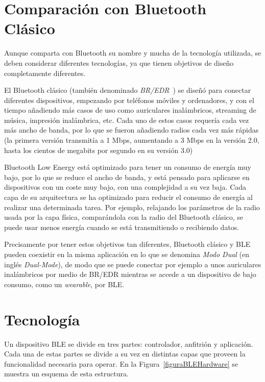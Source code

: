 \section{Comparación con Bluetooth Clásico}
\label{makereference2.1}

Aunque comparta con Bluetooth su nombre y mucha de la tecnología utilizada, se deben considerar diferentes tecnologías, ya que tienen objetivos de diseño completamente diferentes.

El Bluetooth clásico (también denominado \textit{BR/EDR}~\cite{bluetoothCS}) se diseñó para conectar diferentes dispositivos, empezando por teléfonos móviles y ordenadores, y con el tiempo añadiendo más casos de uso como auriculares inalámbricos, streaming de música, impresión inalámbrica, etc. Cada uno de estos casos requería cada vez más ancho de banda, por lo que se fueron añadiendo radios cada vez más rápidas (la primera versión transmitía a 1 Mbps, aumentando a 3 Mbps en la versión 2.0, hasta los cientos de megabits por segundo en su versión 3.0)

Bluetooth Low Energy está optimizado para tener un consumo de energía muy bajo, por lo que se reduce el ancho de banda, y está pensado para aplicarse en dispositivos con un coste muy bajo, con una complejidad a su vez baja. Cada capa de su arquitectura se ha optimizado para reducir el consumo de energía al realizar una determinada tarea. Por ejemplo, relajando los parámetros de la radio usada por la capa física, comparándola con la radio del Bluetooth clásico, se puede usar menos energía cuando se está transmitiendo o recibiendo datos.

Precisamente por tener estos objetivos tan diferentes, Bluetooth clásico y BLE pueden coexistir en la misma aplicación en lo que se denomina \textit{Modo Dual} (en inglés \textit{Dual-Mode}), de modo que se puede conectar por ejemplo a unos auriculares inalámbricos por medio de BR/EDR mientras se accede a un dispositivo de bajo consumo, como un \textit{wearable}, por BLE.

\section{Tecnología}
\label{makereference2.2}

Un dispositivo BLE se divide en tres partes: controlador, anfitrión y aplicación. Cada una de estas partes se divide a su vez en distintas capas que proveen la funcionalidad necesaria para operar. En la Figura~\ref{figuraBLEHardware} se muestra un esquema de esta estructura.

